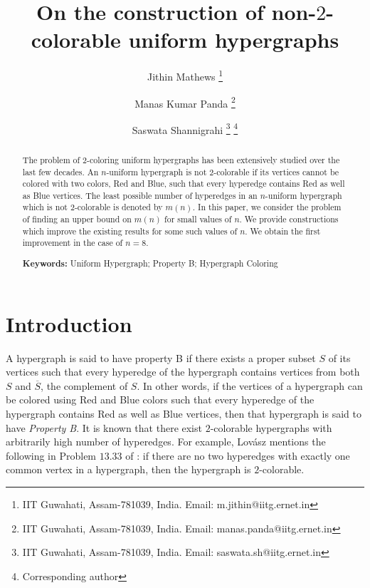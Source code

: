 \documentclass[11pt]{article}
\date{}
\begin{document}
\title{On the construction of non-$2$-colorable uniform hypergraphs}
\author{Jithin Mathews 
\footnote{IIT Guwahati, Assam-781039,
India. Email: m.jithin@iitg.ernet.in} 
\and Manas Kumar Panda \footnote{IIT Guwahati, Assam-781039, India. Email: manas.panda@iitg.ernet.in}
\and Saswata Shannigrahi \footnote{IIT Guwahati, Assam-781039, India. Email: saswata.sh@iitg.ernet.in}
\footnote{Corresponding author}
}
\maketitle


\begin{abstract}
The problem of $2$-coloring uniform hypergraphs has been extensively studied over the last few decades. An $n$-uniform hypergraph is not 
$2$-colorable if its vertices cannot be colored with two colors, Red and Blue, such that every hyperedge contains Red as well as Blue vertices. The least possible number of hyperedges in an $n$-uniform hypergraph which is not $2$-colorable is denoted by $m(n)$. In this paper, we consider the problem of finding an upper bound on $m(n)$ for small values of $n$. We provide constructions which improve the existing results for some such values of $n$. We obtain the first improvement in the case of $n=8$.
\vspace{1mm}

\noindent \textbf{Keywords:} Uniform Hypergraph; Property B; Hypergraph Coloring
\end{abstract}

\section{Introduction}
\label{introduction}

A hypergraph is said to have property B if there exists a proper subset $\textit{S}$ of its vertices such that every hyperedge of the hypergraph contains vertices from both $\textit{S}$ and $\textit{$\overline{S}$}$, the complement of $S$. In other words, if the vertices of a hypergraph can be colored using Red and Blue colors such that every hyperedge of the hypergraph contains Red as well as Blue vertices, then that hypergraph is said to have {\it Property B}. It is known that there exist $2$-colorable hypergraphs with arbitrarily high number of hyperedges. For example, Lov\'{a}sz mentions the following in Problem $13.33$ of \cite{Lovasz}: if there are no two hyperedges with exactly one common vertex in a hypergraph, then the hypergraph is $2$-colorable. 
\end{document}

